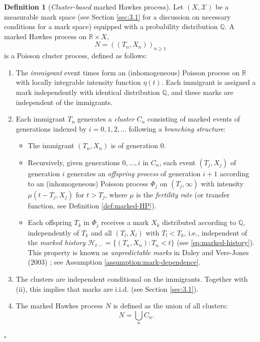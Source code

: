 \documentclass[12pt,a4paper]{report}
\theoremstyle{plain}
\theoremstyle{definition}
\newtheorem{definition}{Definition}[section]
\theoremstyle{remark}
\newcommand{\1}{\mathbf{1}}
\begin{document}
\begin{definition}[\emph{Cluster-based} marked Hawkes process]\label{def:cluster-based}
Let $({X},\mathcal{X})$ be a measurable mark space (see Section \ref{sec:3.1} for a discussion on necessary conditions for a mark space) equipped with a probability distribution $\mathbb{Q}$. A marked Hawkes process on $\mathbb{R} \times {X}$,
\[
N = ((T_n,X_n))_{n\ge 1}
\]
is a Poisson cluster process, defined as follows:

\begin{enumerate}

\item[(i)]
The \emph{immigrant} event times form an (inhomogeneous) Poisson process on $\mathbb{R}$ with locally integrable intensity function $\eta(t)$. Each immigrant is assigned a mark independently with identical distribution $\mathbb{Q}$, and these marks are independent of the immigrants.

\item[(ii)]
Each immigrant $T_n$ generates a \emph{cluster} $C_n$ consisting of marked events of generations indexed by $i=0,1,2,\dots$ following a \emph{branching structure}:

\begin{itemize}

\item The immigrant $(T_n,X_n)$ is of generation $0$.

\item Recursively, given generations $0,\dots,i$ in $C_n$, each event $(T_j,X_j)$ of generation $i$ generates an \emph{offspring process} of generation $i+1$ according to an (inhomogeneous) Poisson process $\Phi_j$ on $(T_j,\infty)$ with intensity $\mu(t-T_j,X_j)$ for $t>T_j$, where $\mu$ is the \emph{fertility rate} (or transfer function, see Definition \ref{def:marked-HP}).

\item Each offspring $T_k$ in $\Phi_j$ receives a mark $X_k$ distributed according to $\mathbb{Q}$, independently of $T_k$ and all $(T_l, X_l)$ with $T_l < T_k$, i.e., independent of the \emph{marked history} $\mathcal{H}_{t-}=\{(T_n,X_n):T_n<t\}$ (see \eqref{eq:marked-history}). This property is known as \emph{unpredictable marks} in Daley and Vere-Jones (2003) \cite{DVJ03}; see Assumption \ref{assumption:mark-dependence}.

\end{itemize}

\item[(iii)]
The clusters are independent conditional on the immigrants. Together with (ii), this implies that marks are i.i.d. (see Section \ref{sec:3.1}).

\item[(iv)]
The marked Hawkes process $N$ is defined as the union of all clusters:
\[
N = \bigcup_n C_n.
\]

\end{enumerate}\hfill $\square$
\end{definition}
\end{document}

